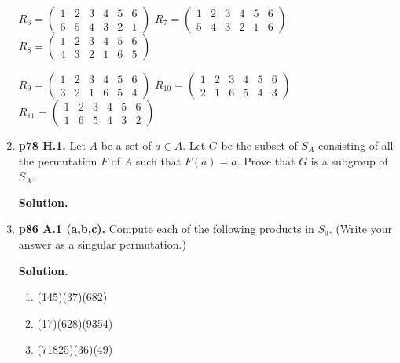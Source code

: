 \documentclass[11pt]{article}
\begin{document}
\begin{enumerate}
	$R_6 = \begin{pmatrix}
		1 & 2 & 3 & 4 & 5 & 6 \\
		6 & 5 & 4 & 3 & 2 & 1
	\end{pmatrix}$
	$R_7 = \begin{pmatrix}
		1 & 2 & 3 & 4 & 5 & 6 \\
		5 & 4 & 3 & 2 & 1 & 6
	\end{pmatrix}$
	$R_8 = \begin{pmatrix}
		1 & 2 & 3 & 4 & 5 & 6 \\
		4 & 3 & 2 & 1 & 6 & 5
	\end{pmatrix}$
	
	$R_9 = \begin{pmatrix}
		1 & 2 & 3 & 4 & 5 & 6 \\
		3 & 2 & 1 & 6 & 5 & 4
	\end{pmatrix}$
	$R_{10} = \begin{pmatrix}
		1 & 2 & 3 & 4 & 5 & 6 \\
		2 & 1 & 6 & 5 & 4 & 3
	\end{pmatrix}$
	$R_{11} = \begin{pmatrix}
		1 & 2 & 3 & 4 & 5 & 6 \\
		1 & 6 & 5 & 4 & 3 & 2
	\end{pmatrix}$

\item {\bfseries p78 H.1.} Let $A$ be a set of $a \in A$. Let $G$ be the subset of $S_A$ consisting of all the permutation $F$ of $A$ such that $F(a) = a$. Prove that $G$ is a subgroup of $S_A$.
  
	{\bfseries Solution.}
  
\newpage

\item {\bfseries p86 A.1 (a,b,c).} Compute each of the following products in $S_9$. (Write your answer as a singular permutation.)
  
	{\bfseries Solution.}
	
	\begin{enumerate}
  
		\item (145)(37)(682)
		
		\item (17)(628)(9354)
		
		\item (71825)(36)(49)
  
  \end{enumerate}


\end{enumerate}
\end{document}
